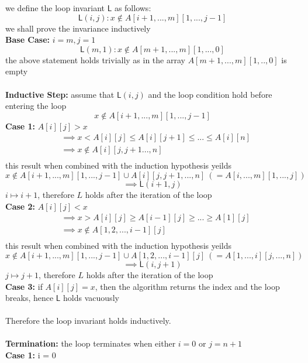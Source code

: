 \documentclass[12pt]{article}
\begin{document}
we define the loop invariant $\mathsf{L}$ as follows:\\
$$\mathsf{L}(i, j): x \notin A[i+1,...,m][1,...,j-1]$$
we shall prove the invariance inductively\\
\textbf{Base Case:} $i = m, j = 1$\\
$$\mathsf{L}(m, 1): x \notin A[m+1,...,m][1,...,0]$$
the above statement holds trivially as in the array $A[m+1,...,m][1,..,0]$ is empty\\\\
\textbf{Inductive Step:} assume that $\mathsf{L}(i, j)$ and the loop condition hold before entering the loop\\
$$x \notin A[i+1,...,m][1,...,j-1]$$
\textbf{Case 1:} $A[i][j] > x$\\
    \begin{align*}
        &\implies x < A[i][j] \leq A[i][j+1] \leq ... \leq A[i][n]\\
        &\implies x \notin A[i][j,j+1...,n]\\
    \end{align*}
    this result when combined with the induction hypothesis yeilds
    $$x \notin A[i+1,...,m][1,...,j-1] \cup A[i][j,j+1,...,n] ~ (= A[i,...,m][1,...,j])$$
    $$\implies \mathsf{L}(i+1, j)$$
    $i \mapsto i+1$, therefore $L$ holds after the iteration of the loop\\
\textbf{Case 2:} $A[i][j] < x$\\
    \begin{align*}
        &\implies x > A[i][j] \geq A[i-1][j] \geq ... \geq A[1][j]\\
        &\implies x \notin A[1,2,...,i-1][j]\\
    \end{align*}
    this result when combined with the induction hypothesis yeilds
    $$x \notin A[i+1,...,m][1,...,j-1] \cup A[1,2,...,i-1][j] ~ (= A[1,...,i][j,...,n])$$
    $$\implies \mathsf{L}(i, j+1)$$
    $j \mapsto j+1$, therefore $L$ holds after the iteration of the loop\\
\textbf{Case 3:} if $A[i][j] = x$, then the algorithm returns the index and the loop breaks, hence $\mathsf{L}$ holds vacuously\\
\\
Therefore the loop invariant holds inductively.\\
\\
\textbf{Termination:} the loop terminates when either $i = 0$ or $j = n+1$\\
\textbf{Case 1:} i = 0\\
\end{document}
